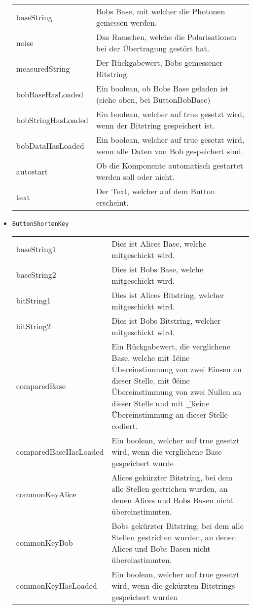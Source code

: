 \begin{itemize}
\begin{tabularx}{\textwidth}{p{4.5cm}p{9.5cm}}
baseString &  Bobs Base, mit welcher die Photonen gemessen werden. \\
noise &  Das Rauschen, welche die Polarisationen bei der Übertragung gestört hat. \\
measuredString &  Der Rückgabewert, Bobs gemessener Bitstring. \\
bobBaseHasLoaded & Ein boolean, ob Bobs Base geladen ist (siehe oben, bei ButtonBobBase) \\
bobStringHasLoaded & Ein boolean, welcher auf true gesetzt wird, wenn der Bitstring gespeichert ist. \\
bobDataHasLoaded &  Ein boolean, welcher auf true gesetzt wird, wenn alle Daten von Bob gespeichert sind. \\
autostart & Ob die Komponente automatisch gestartet werden soll oder nicht. \\
text & Der Text, welcher auf dem Button erscheint.
\end{tabularx}
\item \texttt{ButtonShortenKey} \\
\begin{tabularx}{\textwidth}{p{4.5cm}p{9.5cm}} \\
baseString1 & Dies ist Alices Base, welche mitgeschickt wird. \\
baseString2 & Dies ist Bobs Base, welche mitgeschickt wird. \\
bitString1 & Dies ist Alices Bitstring, welcher mitgeschickt wird. \\
bitString2 &  Dies ist Bobs Bitstring, welcher mitgeschickt wird. \\
comparedBase & Ein Rückgabewert, die verglichene Base, welche mit \'1\' eine Übereinstimmung von zwei Einsen an dieser Stelle, mit \'0\' eine Übereinstimmung von zwei Nullen an dieser Stelle und mit \'\_\' keine Übereinstimmung an dieser Stelle codiert. \\ 
comparedBaseHasLoaded &  Ein boolean, welcher auf true gesetzt wird, wenn die verglichene Base gespeichert wurde \\
commonKeyAlice &  Alices gekürzter Bitstring, bei dem alle Stellen gestrichen wurden, an denen Alices und Bobs Basen nicht übereinstimmten. \\
commonKeyBob & Bobs gekürzter Bitstring, bei dem alle Stellen gestrichen wurden, an denen Alices und Bobs Basen nicht übereinstimmten. \\
commonKeyHasLoaded &  Ein boolean, welcher auf true gesetzt wird, wenn die gekürzten Bitstrings gespeichert wurden \\

\end{tabularx}
\end{itemize}
